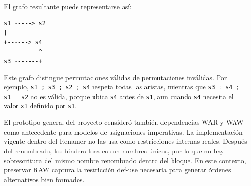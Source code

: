 El grafo resultante puede representarse así:

\begin{verbatim}
s1 -----> s2
|
+------> s4
          ^
s3 -------+
\end{verbatim}

Este grafo distingue permutaciones válidas de permutaciones inválidas. Por ejemplo, \verb|s1 ; s3 ; s2 ; s4| respeta todas las aristas, mientras que \verb|s3 ; s4 ; s1 ; s2| no es válida, porque ubica \texttt{s4} antes de \texttt{s1}, aun cuando \texttt{s4} necesita el valor \texttt{x1} definido por \texttt{s1}.

El prototipo general del proyecto consideró también dependencias WAR y WAW como antecedente para modelos de asignaciones imperativas. La implementación vigente dentro del Renamer no las usa como restricciones internas reales. Después del renombrado, los binders locales son nombres únicos, por lo que no hay sobrescritura del mismo nombre renombrado dentro del bloque. En este contexto, preservar RAW captura la restricción def-use necesaria para generar órdenes alternativos bien formados.
